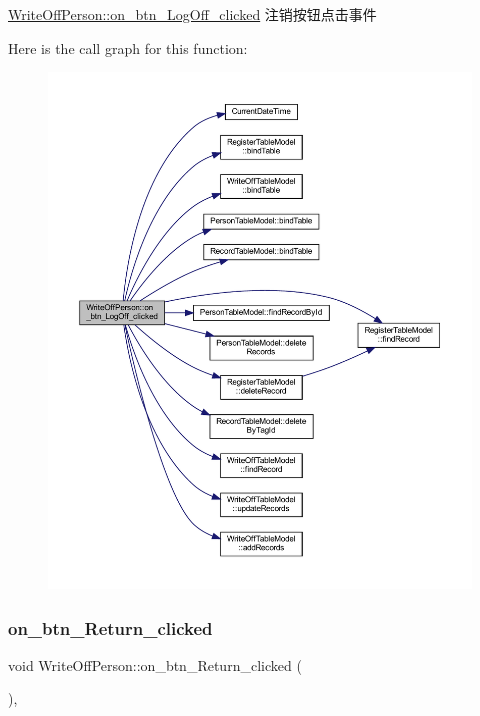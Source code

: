 \mbox{\hyperlink{class_write_off_person_a4ac5c022a769acb97dfb615a2fceb1f3}{Write\+Off\+Person\+::on\+\_\+btn\+\_\+\+Log\+Off\+\_\+clicked}} 注销按钮点击事件 

Here is the call graph for this function\+:
\nopagebreak
\begin{figure}[H]
\begin{center}
\leavevmode
\includegraphics[width=350pt]{class_write_off_person_a4ac5c022a769acb97dfb615a2fceb1f3_cgraph}
\end{center}
\end{figure}
\mbox{\label{class_write_off_person_ab1256ef9bad90ead6cbe0f925adf05f7}} 
\subsubsection{\texorpdfstring{on\_btn\_Return\_clicked}{on\_btn\_Return\_clicked}}
{\footnotesize\ttfamily void Write\+Off\+Person\+::on\+\_\+btn\+\_\+\+Return\+\_\+clicked (\begin{DoxyParamCaption}{ }\end{DoxyParamCaption})\hspace{0.3cm}{\ttfamily [private]}, {\ttfamily [slot]}}



